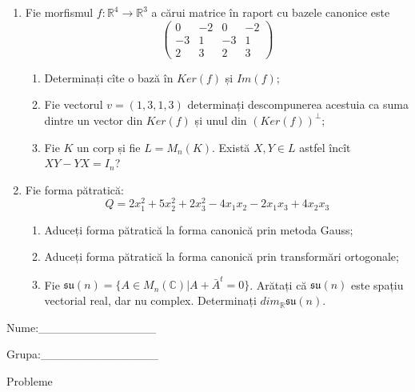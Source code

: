 \documentclass{article}
\begin{document}
\begin{enumerate}
 \item Fie morfismul $f:\mathbb{R}^4 \to \mathbb{R}^3$ a cărui matrice în raport cu bazele canonice este
$$\begin{pmatrix}
0&-2&0&-2\\
-3&1&-3&1\\
2&3&2&3
\end{pmatrix}$$

\begin{enumerate}
\item Determinați cîte o bază în $Ker(f)$ și $Im(f)$;
\item Fie vectorul $v=(1,3,1,3)$ determinați descompunerea acestuia ca suma dintre un vector din $Ker(f)$ și unul din $(Ker(f))^\perp$;
\item Fie $K$ un corp și fie $L=M_n(K)$. Există $X,Y \in L$ astfel încît $XY-YX=I_n$?  
\end{enumerate}
\item Fie forma pătratică:
$$Q= 2x_1^2+5x_2^2+2x_3^2-4x_1x_2-2x_1x_3+4x_2x_3$$

\begin{enumerate}
\item Aduceți forma pătratică la forma canonică prin metoda Gauss;
\item Aduceți forma pătratică la forma canonică prin transformări ortogonale;
\item Fie $\mathfrak{su}(n)=\{ A \in M_n(\mathbb{C}) | A+\bar{A}^t=0\}$. Arătați că $\mathfrak{su}(n)$ este spațiu vectorial real, dar nu complex.
Determinați $dim_{\mathbb{R}}\mathfrak{su}(n)$.
\end{enumerate}
\end{enumerate}
\newpage
\begin{flushright}
Nume:\_\_\_\_\_\_\_\_\_\_\_\_\_\_
 
 
Grupa:\_\_\_\_\_\_\_\_\_\_\_\_\_\_
\end{flushright}
\begin{center}
\vspace{2cm}
{\Large Probleme}
\vspace{2cm}
\end{center}
\end{document}
